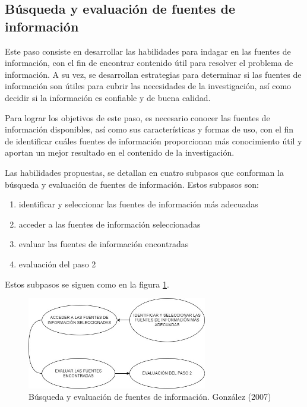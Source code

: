 
\subsection{Búsqueda y evaluación de fuentes de información}
\label{secPaso2Cap2}

Este paso consiste en desarrollar las habilidades para indagar en las fuentes de información, con el fin de encontrar contenido útil para resolver el problema de información. A su vez, se desarrollan estrategias para determinar si las fuentes de información son útiles para cubrir las necesidades de la investigación, así como decidir si la información es confiable y de buena calidad.

Para lograr los objetivos de este paso, es necesario conocer las fuentes de información disponibles, así como sus características y formas de uso, con el fin de identificar cuáles fuentes de información proporcionan más conocimiento útil y aportan un mejor resultado en el contenido de la investigación.

Las habilidades propuestas, se detallan en cuatro subpasos que conforman la búsqueda y evaluación de fuentes de información. Estos subpasos son:

\begin{enumerate}
  \item identificar y seleccionar las fuentes de información más adecuadas
  \item acceder a las fuentes de información seleccionadas
  \item evaluar las fuentes de información encontradas
  \item evaluación del paso 2
\end{enumerate}

Estos subpasos se siguen como en la figura \ref{fig:24}.

\begin{figure}[H]
  \centering
  \includegraphics[width=0.70\textwidth]{Cap2/Figuras/Búsqueda y evaluación de información.jpg}
  \caption{Búsqueda y evaluación de fuentes de información. González (2007)}
  \label{fig:24}
\end{figure}

